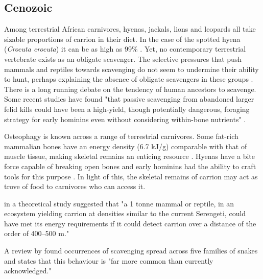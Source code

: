 \documentclass[a4paper,12pt]{article}
\begin{document}
\subsection*{Cenozoic}
Among terrestrial African carnivores, hyenas, jackals, lions and leopards all take sizable proportions of carrion in their diet.
In the case of the spotted hyena (\textit{Crocuta crocuta}) it can be as high as 99\% \citep{benbow2015introduction}. 
Yet, no contemporary terrestrial vertebrate exists as an obligate scavenger. 
The selective pressures that push mammals and reptiles towards scavenging do not seem to undermine their ability to hunt, perhaps explaining the absence of obligate scavengers in these groups \citep{ruxton2004obligate}.
\\There is a long running debate on the tendency of human ancestors to scavenge. 
Some recent studies have found "that passive scavenging from abandoned larger felid kills could have been a high-yield, though potentially dangerous, foraging strategy for early hominins even without considering within-bone nutrients" \citep{pobiner2015new}. 

Osteophagy is known across a range of terrestrial carnivores.
Some fat-rich mammalian bones have an energy density (6.7 kJ/g) comparable with that of muscle tissue, making skeletal remains an enticing resource \citep{brown1989study}. 
Hyenas have a bite force capable of breaking open bones and early hominins had the ability to craft tools for this purpose \citep{hone2010feeding,ARCM:ARCM12084}. 
In light of this, the skeletal remains of carrion may act as trove of food to carnivores who can access it.  

\cite{ruxton2004obligate} in a theoretical study suggested that "a 1 tonne mammal or reptile, in an ecosystem yielding carrion at densities similar to the current Serengeti, could have met its energy requirements if it could detect carrion over a distance of the order of 400–500 m."


A review by \cite{devault2002scavenging} found occurrences of scavenging spread across five families of snakes and states that this behaviour is "far more common than currently acknowledged."
\end{document}

